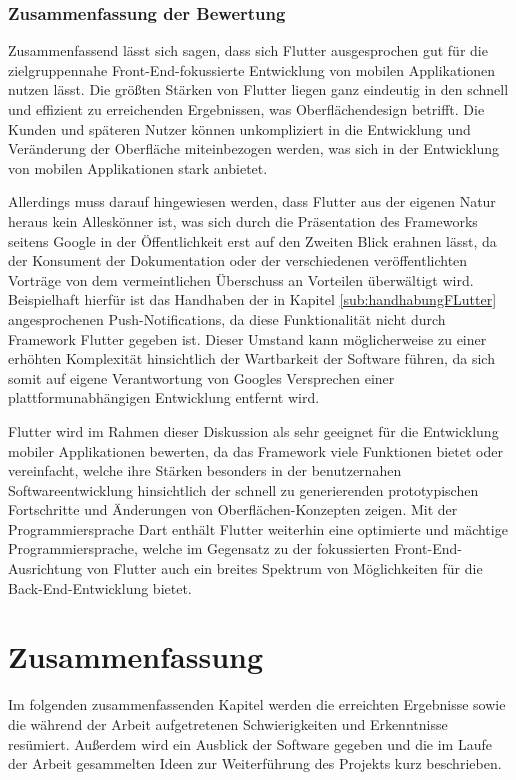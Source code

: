 \documentclass[bibliography=totoc,listof=totoc,BCOR=5mm,DIV=12,oneside]{scrbook}
\begin{document}
\subsection{Zusammenfassung der Bewertung}
\par Zusammenfassend lässt sich sagen, dass sich Flutter ausgesprochen gut für die zielgruppennahe Front-End-fokussierte Entwicklung von mobilen Applikationen nutzen lässt. Die größten Stärken von Flutter liegen ganz eindeutig in den schnell und effizient zu erreichenden Ergebnissen, was Oberflächendesign betrifft. Die Kunden und späteren Nutzer können unkompliziert in die Entwicklung und Veränderung der Oberfläche miteinbezogen werden, was sich in der Entwicklung von mobilen Applikationen stark anbietet.

\par \bigskip Allerdings muss darauf hingewiesen werden, dass Flutter aus der eigenen Natur heraus kein Alleskönner ist, was sich durch die Präsentation des Frameworks seitens Google in der Öffentlichkeit erst auf den Zweiten Blick erahnen lässt, da der Konsument der Dokumentation oder der verschiedenen veröffentlichten Vorträge von dem vermeintlichen Überschuss an Vorteilen überwältigt wird. Beispielhaft hierfür ist das Handhaben der in Kapitel \ref{sub:handhabungFLutter} angesprochenen Push-Notifications, da diese Funktionalität nicht durch Framework Flutter gegeben ist. Dieser Umstand kann möglicherweise zu einer erhöhten Komplexität hinsichtlich der Wartbarkeit der Software führen, da sich somit auf eigene Verantwortung von Googles Versprechen einer plattformunabhängigen Entwicklung entfernt wird.

\par \bigskip Flutter wird im Rahmen dieser Diskussion als sehr geeignet für die Entwicklung mobiler Applikationen bewerten, da das Framework viele Funktionen bietet oder vereinfacht, welche ihre Stärken besonders in der benutzernahen Softwareentwicklung hinsichtlich der schnell zu generierenden prototypischen Fortschritte und Änderungen von Oberflächen-Konzepten zeigen. Mit der Programmiersprache Dart enthält Flutter weiterhin eine optimierte und mächtige Programmiersprache, welche im Gegensatz zu der fokussierten Front-End-Ausrichtung von Flutter auch ein breites Spektrum von Möglichkeiten für die Back-End-Entwicklung bietet.

\chapter{Zusammenfassung} \label{chap:ergebnisse}
\par Im folgenden zusammenfassenden Kapitel werden die erreichten Ergebnisse sowie die während der Arbeit aufgetretenen Schwierigkeiten und Erkenntnisse resümiert. Außerdem wird ein Ausblick der Software gegeben und die im Laufe der Arbeit gesammelten Ideen zur Weiterführung des Projekts kurz beschrieben.
\end{document}
